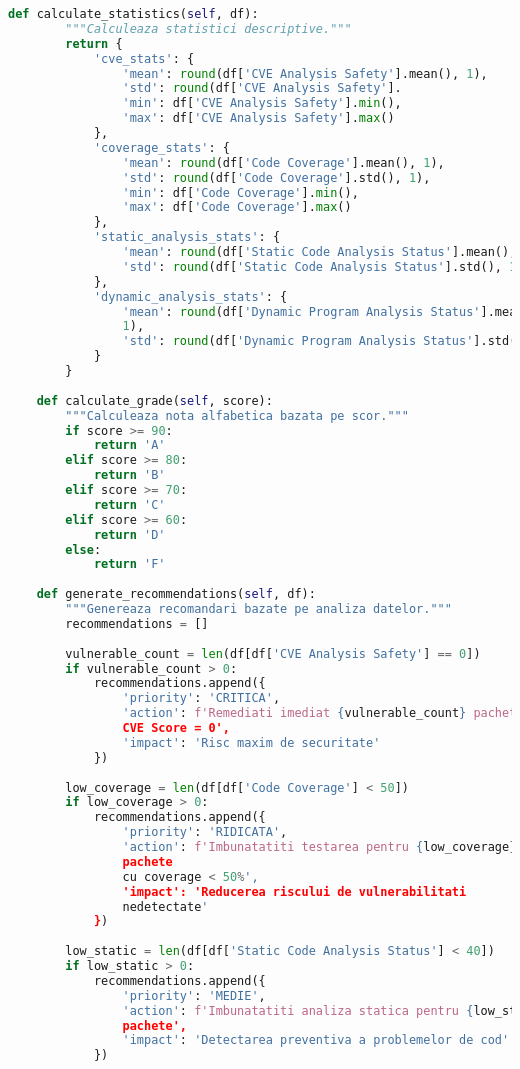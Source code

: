 \documentclass[12pt,a4paper]{article}
\begin{document}
\begin{lstlisting}[language=Python, caption=Script final pentru calcularea scorului de securitate (fără simulări), label=lst:final_security_calculator]
    def calculate_statistics(self, df):
        """Calculeaza statistici descriptive."""
        return {
            'cve_stats': {
                'mean': round(df['CVE Analysis Safety'].mean(), 1),
                'std': round(df['CVE Analysis Safety'].
                'min': df['CVE Analysis Safety'].min(),
                'max': df['CVE Analysis Safety'].max()
            },
            'coverage_stats': {
                'mean': round(df['Code Coverage'].mean(), 1),
                'std': round(df['Code Coverage'].std(), 1),
                'min': df['Code Coverage'].min(),
                'max': df['Code Coverage'].max()
            },
            'static_analysis_stats': {
                'mean': round(df['Static Code Analysis Status'].mean(), 1),
                'std': round(df['Static Code Analysis Status'].std(), 1)
            },
            'dynamic_analysis_stats': {
                'mean': round(df['Dynamic Program Analysis Status'].mean(),
                1),
                'std': round(df['Dynamic Program Analysis Status'].std(), 1)
            }
        }
    
    def calculate_grade(self, score):
        """Calculeaza nota alfabetica bazata pe scor."""
        if score >= 90:
            return 'A'
        elif score >= 80:
            return 'B'
        elif score >= 70:
            return 'C'
        elif score >= 60:
            return 'D'
        else:
            return 'F'
    
    def generate_recommendations(self, df):
        """Genereaza recomandari bazate pe analiza datelor."""
        recommendations = []
        
        vulnerable_count = len(df[df['CVE Analysis Safety'] == 0])
        if vulnerable_count > 0:
            recommendations.append({
                'priority': 'CRITICA',
                'action': f'Remediati imediat {vulnerable_count} pachete cu 
                CVE Score = 0',
                'impact': 'Risc maxim de securitate'
            })
        
        low_coverage = len(df[df['Code Coverage'] < 50])
        if low_coverage > 0:
            recommendations.append({
                'priority': 'RIDICATA',
                'action': f'Imbunatatiti testarea pentru {low_coverage} 
                pachete 
                cu coverage < 50%',
                'impact': 'Reducerea riscului de vulnerabilitati 
                nedetectate'
            })
        
        low_static = len(df[df['Static Code Analysis Status'] < 40])
        if low_static > 0:
            recommendations.append({
                'priority': 'MEDIE',
                'action': f'Imbunatatiti analiza statica pentru {low_static} 
                pachete',
                'impact': 'Detectarea preventiva a problemelor de cod'
            })
        

\end{lstlisting}
\end{document}

